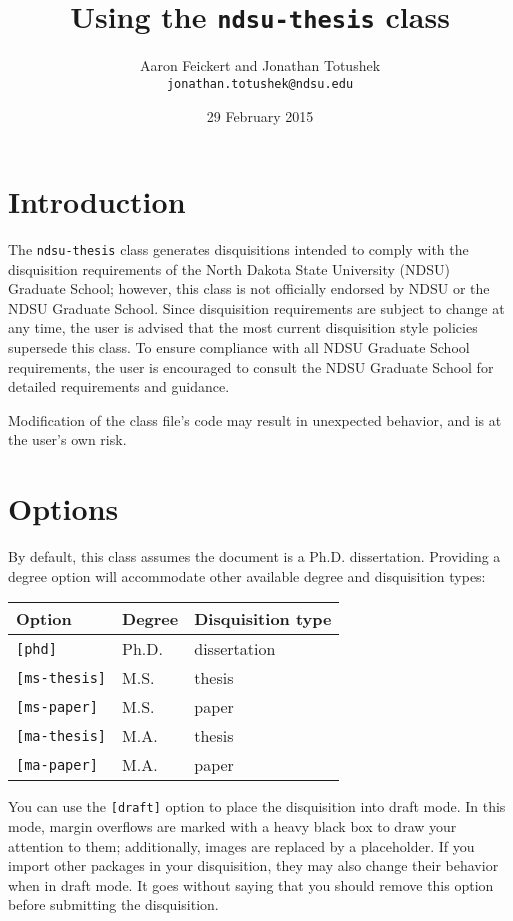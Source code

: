 \documentclass{article}
\title{Using the \texttt{ndsu-thesis} class}
\author{Aaron Feickert and Jonathan Totushek \\ \texttt{jonathan.totushek@ndsu.edu}}
\date{29 February 2015}
\begin{document}
\maketitle

\section{Introduction}
The \texttt{ndsu-thesis} class generates disquisitions intended to comply with the disquisition requirements of the North Dakota State University (NDSU) Graduate School; however, this class is not officially endorsed by NDSU or the NDSU Graduate School. Since disquisition requirements are subject to change at any time, the user is advised that the most current disquisition style policies supersede this class. To ensure compliance with all NDSU Graduate School requirements, the user is encouraged to consult the NDSU Graduate School for detailed requirements and guidance.

Modification of the class file's code may result in unexpected behavior, and is at the user's own risk.

\section{Options}
By default, this class assumes the document is a Ph.D. dissertation. Providing a degree option will accommodate other available degree and disquisition types:
\begin{center}
\begin{tabular}{lll}
Option & Degree & Disquisition type \\
\hline
\texttt{[phd]} & Ph.D. & dissertation \\
\texttt{[ms-thesis]} & M.S. & thesis \\
\texttt{[ms-paper]} & M.S. & paper \\
\texttt{[ma-thesis]} & M.A. & thesis \\
\texttt{[ma-paper]} & M.A. & paper \\
\end{tabular}
\end{center}

You can use the \texttt{[draft]} option to place the disquisition into draft mode. In this mode, margin overflows are marked with a heavy black box to draw your attention to them; additionally, images are replaced by a placeholder. If you import other packages in your disquisition, they may also change their behavior when in draft mode. It goes without saying that you should remove this option before submitting the disquisition.
\end{document}

